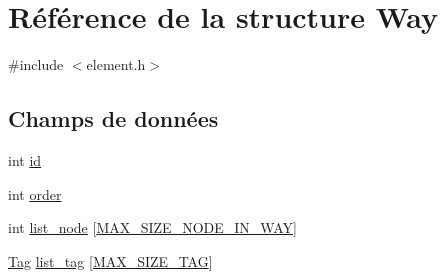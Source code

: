 \hypertarget{struct_way}{\section{Référence de la structure Way}
\label{struct_way}
}


{\ttfamily \#include $<$element.\-h$>$}

\subsection*{Champs de données}
\begin{DoxyCompactItemize}
\item 
int \hyperlink{struct_way_a7c8440a005753c31f2722f98e51b1ce5_a7c8440a005753c31f2722f98e51b1ce5}{id}
\item 
int \hyperlink{struct_way_a754a3e559d7f2574bd11c14234a55e50_a754a3e559d7f2574bd11c14234a55e50}{order}
\item 
int \hyperlink{struct_way_a280d1bd29da13eb37744caae33182064_a280d1bd29da13eb37744caae33182064}{list\-\_\-node} \mbox{[}\hyperlink{constante_8h_a8f43784cbdaae8882338f066bf88d6c2_a8f43784cbdaae8882338f066bf88d6c2}{M\-A\-X\-\_\-\-S\-I\-Z\-E\-\_\-\-N\-O\-D\-E\-\_\-\-I\-N\-\_\-\-W\-A\-Y}\mbox{]}
\item 
\hyperlink{struct_tag}{Tag} \hyperlink{struct_way_a1aafa2cd308feca6fc6804ea305c70f3_a1aafa2cd308feca6fc6804ea305c70f3}{list\-\_\-tag} \mbox{[}\hyperlink{constante_8h_ac5e9843814463e2ce3fa687df8a75fe7_ac5e9843814463e2ce3fa687df8a75fe7}{M\-A\-X\-\_\-\-S\-I\-Z\-E\-\_\-\-T\-A\-G}\mbox{]}
\end{DoxyCompactItemize}


